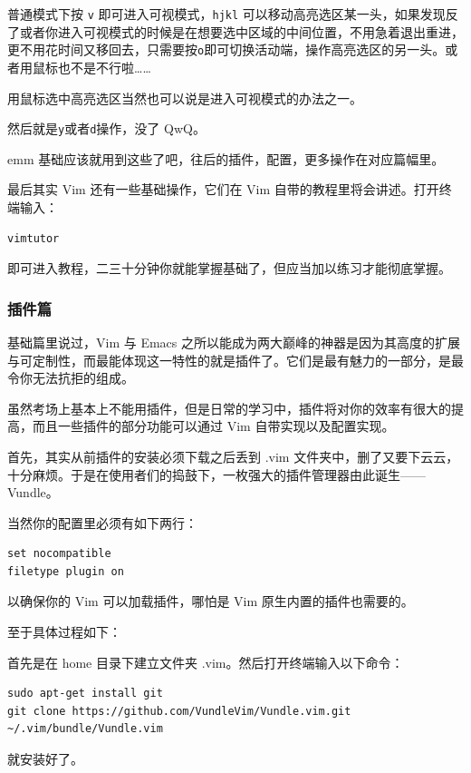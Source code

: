 普通模式下按 \texttt{v} 即可进入可视模式，\texttt{hjkl} 可以移动高亮选区某一头，如果发现反了或者你进入可视模式的时候是在想要选中区域的中间位置，不用急着退出重进，更不用花时间又移回去，只需要按\texttt{o}即可切换活动端，操作高亮选区的另一头。或者用鼠标也不是不行啦……

用鼠标选中高亮选区当然也可以说是进入可视模式的办法之一。

然后就是\texttt{y}或者\texttt{d}操作，没了 QwQ。

emm 基础应该就用到这些了吧，往后的插件，配置，更多操作在对应篇幅里。

最后其实 Vim 还有一些基础操作，它们在 Vim 自带的教程里将会讲述。打开终端输入：

\begin{verbatim}
vimtutor
\end{verbatim}

即可进入教程，二三十分钟你就能掌握基础了，但应当加以练习才能彻底掌握。

\subsubsection{插件篇}

基础篇里说过，Vim 与 Emacs 之所以能成为两大巅峰的神器是因为其高度的扩展与可定制性，而最能体现这一特性的就是插件了。它们是最有魅力的一部分，是最令你无法抗拒的组成。

虽然考场上基本上不能用插件，但是日常的学习中，插件将对你的效率有很大的提高，而且一些插件的部分功能可以通过 Vim 自带实现以及配置实现。

首先，其实从前插件的安装必须下载之后丢到 .vim 文件夹中，删了又要下云云，十分麻烦。于是在使用者们的捣鼓下，一枚强大的插件管理器由此诞生——Vundle。

当然你的配置里必须有如下两行：

\begin{verbatim}
set nocompatible
filetype plugin on
\end{verbatim}

以确保你的 Vim 可以加载插件，哪怕是 Vim 原生内置的插件也需要的。

至于具体过程如下：

首先是在 home 目录下建立文件夹 .vim。然后打开终端输入以下命令：

\begin{verbatim}
sudo apt-get install git
git clone https://github.com/VundleVim/Vundle.vim.git ~/.vim/bundle/Vundle.vim
\end{verbatim}

就安装好了。

